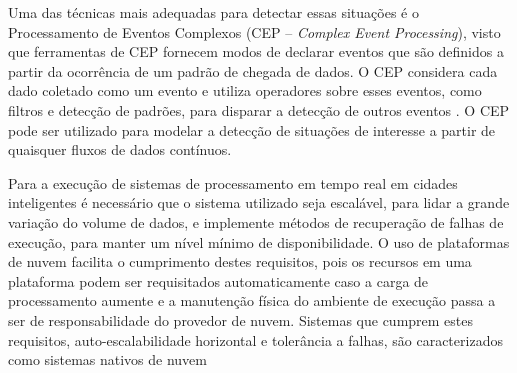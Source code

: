 Uma das técnicas mais adequadas para detectar essas situações é o Processamento de Eventos Complexos (CEP – \textit{Complex Event Processing}), visto que ferramentas de CEP fornecem modos de declarar eventos que são definidos a partir da ocorrência de um padrão de chegada de dados. O CEP considera cada dado coletado como um evento e utiliza operadores sobre esses eventos, como filtros e detecção de padrões, para disparar a detecção de outros eventos \citep{Etzion:2010:EPA:1894960}.
O CEP pode ser utilizado para modelar a detecção de situações de interesse a partir de quaisquer fluxos de dados contínuos. 

Para a execução de sistemas de processamento em tempo real em cidades inteligentes é necessário que o sistema utilizado seja escalável, para lidar a grande variação do volume de dados, e implemente métodos de recuperação de falhas de execução, para manter um nível mínimo de disponibilidade. O uso de plataformas de nuvem facilita o cumprimento destes requisitos, pois os recursos em uma plataforma podem ser requisitados automaticamente caso a carga de processamento aumente e a manutenção física do ambiente de execução passa a ser de responsabilidade do provedor de nuvem. Sistemas que cumprem estes requisitos, auto-escalabilidade horizontal e tolerância a falhas, são caracterizados como sistemas nativos de nuvem~\citep{garrison2017cloud}


